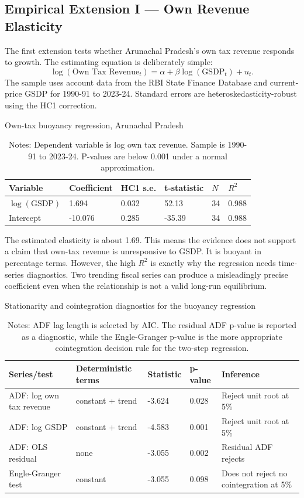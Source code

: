 \documentclass[11pt,a4paper]{article}
\begin{document}
\subsection{Empirical Extension I --- Own Revenue Elasticity}

The first extension tests whether Arunachal Pradesh's own tax revenue responds to growth. The estimating equation is deliberately simple:
\[
\log(\text{Own Tax Revenue}_t)=\alpha+\beta \log(\text{GSDP}_t)+u_t .
\]
The sample uses account data from the RBI State Finance Database and current-price GSDP for 1990-91 to 2023-24. Standard errors are heteroskedasticity-robust using the HC1 correction.

\begin{table}[H]
\centering
\caption{Own-tax buoyancy regression, Arunachal Pradesh}
\small
\begin{tabular}{L{3.0cm}C{2.0cm}C{1.8cm}C{1.8cm}C{1.6cm}C{1.6cm}}
\toprule
Variable & Coefficient & HC1 s.e. & t-statistic & $N$ & $R^2$ \\
\midrule
$\log(\text{GSDP})$ & 1.694 & 0.032 & 52.13 & 34 & 0.988 \\
Intercept & -10.076 & 0.285 & -35.39 & 34 & 0.988 \\
\bottomrule
\end{tabular}
\caption*{\footnotesize Notes: Dependent variable is log own tax revenue. Sample is 1990-91 to 2023-24. P-values are below 0.001 under a normal approximation.}
\end{table}

The estimated elasticity is about 1.69. This means the evidence does not support a claim that own-tax revenue is unresponsive to GSDP. It is buoyant in percentage terms. However, the high $R^2$ is exactly why the regression needs time-series diagnostics. Two trending fiscal series can produce a misleadingly precise coefficient even when the relationship is not a valid long-run equilibrium.

\begin{table}[H]
\centering
\caption{Stationarity and cointegration diagnostics for the buoyancy regression}
\small
\begin{tabular}{L{4.1cm}C{2.1cm}C{1.7cm}C{1.7cm}L{3.4cm}}
\toprule
Series/test & Deterministic terms & Statistic & p-value & Inference \\
\midrule
ADF: log own tax revenue & constant + trend & -3.624 & 0.028 & Reject unit root at 5\% \\
ADF: log GSDP & constant + trend & -4.583 & 0.001 & Reject unit root at 5\% \\
ADF: OLS residual & none & -3.055 & 0.002 & Residual ADF rejects \\
Engle-Granger test & constant & -3.055 & 0.098 & Does not reject no cointegration at 5\% \\
\bottomrule
\end{tabular}
\caption*{\footnotesize Notes: ADF lag length is selected by AIC. The residual ADF p-value is reported as a diagnostic, while the Engle-Granger p-value is the more appropriate cointegration decision rule for the two-step regression.}
\end{table}
\end{document}
